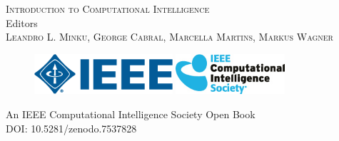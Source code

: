 

\thispagestyle{empty}
\providecommand\pdfbookmark[3][]{} \pdfbookmark[0]{Title Page}{bm:Title}
\vspace*{1cm}
\vfill
\begin{center}
\textsc{\huge{Introduction to Computational Intelligence}}\\
\vfill
Editors\\[\baselineskip]
\textsc{\Large{Leandro L. Minku, George Cabral, Marcella Martins, Markus Wagner}}
\vfill
\end{center}
\begin{figure}[ht!]
\centering
\includegraphics[height=1.5cm]{ieee-logo.png}
\hspace{0.5cm}
\includegraphics[height=1.5cm]{ieee-cis-logo.jpg}
\end{figure}
\begin{center}
An IEEE Computational Intelligence Society Open Book\\
DOI: 10.5281/zenodo.7537828\\[-0.8em]
\end{center}
\clearpage

